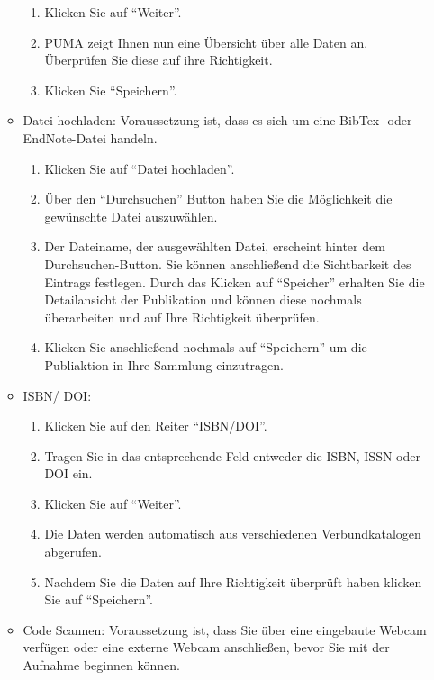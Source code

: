 \documentclass[b5paper,11pt,twoside]{scrbook} %
\begin{document}
\begin{enumerate}
\begin{itemize}
\begin{enumerate}
            \item Klicken Sie auf \enquote{Weiter}.
            \item PUMA zeigt Ihnen nun eine Übersicht über alle Daten an. Überprüfen Sie diese auf ihre Richtigkeit.
            \item Klicken Sie \enquote{Speichern}.
        \end{enumerate}
        \item Datei hochladen:\newline
        Voraussetzung ist, dass es sich um eine BibTex- oder EndNote-Datei handeln.
        \begin{enumerate}
            \item Klicken Sie auf \enquote{Datei hochladen}.
            \item Über den \enquote{Durchsuchen} Button haben Sie die Möglichkeit die gewünschte Datei auszuwählen.
            \item Der Dateiname, der ausgewählten Datei, erscheint hinter dem Durchsuchen-Button. Sie können anschließend die Sichtbarkeit des Eintrags festlegen. Durch das Klicken auf \enquote{Speicher} erhalten Sie die Detailansicht der Publikation und können diese nochmals überarbeiten und auf Ihre Richtigkeit überprüfen.
            \item Klicken Sie anschließend nochmals auf \enquote{Speichern} um die Publiaktion in Ihre Sammlung einzutragen.
        \end{enumerate}
        \item ISBN/ DOI:
        \begin{enumerate}
            \item Klicken Sie auf den Reiter \enquote{ISBN/DOI}.
            \item Tragen Sie in das entsprechende Feld entweder die ISBN, ISSN oder DOI ein.
            \item Klicken Sie auf \enquote{Weiter}.
            \item Die Daten werden automatisch aus verschiedenen Verbundkatalogen abgerufen.
            \item Nachdem Sie die Daten auf Ihre Richtigkeit überprüft haben klicken Sie auf \enquote{Speichern}.
        \end{enumerate}
        \item Code Scannen: %
        \newline
        Voraussetzung ist, dass Sie über eine eingebaute Webcam verfügen oder eine externe Webcam anschließen, bevor Sie mit der Aufnahme beginnen können.

\end{itemize}
\end{enumerate}
\end{document}

